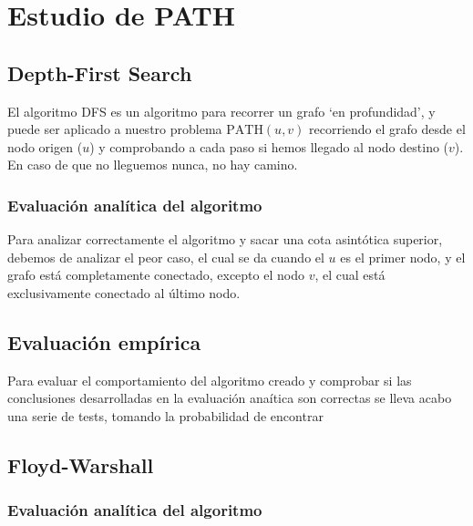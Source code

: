 \section{Estudio de PATH}\label{sec:path}


\subsection{Depth-First Search}\label{subsec:dfs}
El algoritmo DFS\supercite{hopcroft1983data} es un algoritmo para recorrer un grafo `en profundidad', y puede ser aplicado a nuestro problema $\mathrm{PATH}(u,v)$ recorriendo el grafo desde el nodo origen ($u$) y comprobando a cada paso si hemos llegado al nodo destino ($v$). En caso de que no lleguemos nunca, no hay camino.

\subsubsection*{Evaluación analítica del algoritmo}
Para analizar correctamente el algoritmo y sacar una cota asintótica superior, debemos de analizar el peor caso, %
el cual se da cuando el $u$ es el primer nodo, y el grafo está completamente conectado, excepto el nodo $v$, el cual está exclusivamente conectado al último nodo.



\subsection*{Evaluación empírica}

Para evaluar el comportamiento del algoritmo creado y comprobar si las conclusiones desarrolladas en la evaluación anaítica son correctas se lleva acabo una serie de tests, tomando la probabilidad de encontrar






\subsection{Floyd-Warshall}\label{subsec:fw}

\subsubsection*{Evaluación analítica del algoritmo}

